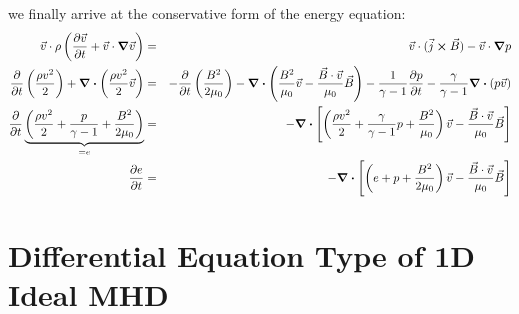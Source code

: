 \documentclass[%
 reprint,
 amsmath,amssymb,
 aps,
]{revtex4-2}
\begin{document}
we finally arrive at the conservative form of the energy equation:
\begin{eqnarray}
\vec v \cdot \rho \left( \pdv{\vec v}{t} + \vec v \cdot \grad \vec v\right) & = & \vec v \cdot (\vec j \cross \vec B) -  \vec v \cdot \grad p \\
\pdv{}{t} \left( \frac{\rho v^2}{2} \right) + \div \left( \frac{\rho v^2}{2} \vec v \right) & = & - \pdv{}{t} \left( \frac{B^2}{2 \mu_0} \right) - \div \left( \frac{B^2}{\mu_0} \vec v - \frac{\vec B \cdot \vec v}{\mu_0} \vec B \right) - \frac{1}{\gamma - 1} \pdv{p}{t}  - \frac{\gamma}{\gamma - 1} \div (p \vec v) \\
\pdv{}{t} \underbrace{\left( \frac{\rho v^2}{2} + \frac{p}{\gamma - 1} + \frac{B^2}{2 \mu_0} \right)}_{= e} & = & - \div \left[ \left( \frac{\rho v^2}{2} + \frac{\gamma}{\gamma - 1} p + \frac{B^2}{\mu_0} \right) \vec v - \frac{\vec B \cdot \vec v}{\mu_0} \vec B \right] \\
\pdv{e}{t} & = & - \div \left[ \left(e + p + \frac{B^2}{2 \mu_0} \right) \vec v - \frac{\vec B \cdot \vec v}{\mu_0} \vec B \right]
\end{eqnarray}

\section{Differential Equation Type of 1D Ideal MHD}
\end{document}
